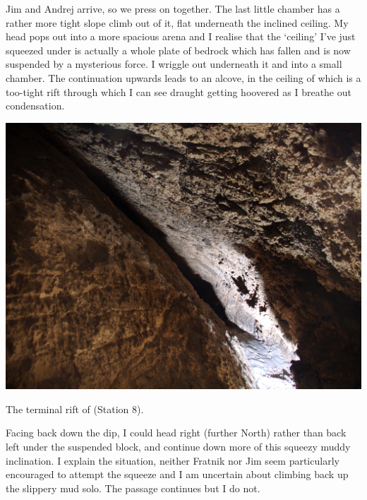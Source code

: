     
Jim and Andrej arrive, so we press on together. The last little chamber
has a rather more tight slope climb out of it, flat underneath the
inclined ceiling. My head pops out into a more spacious arena and I
realise that the `ceiling' I've just squeezed under is actually a whole
plate of bedrock which has fallen and is now suspended by a mysterious
force. I wriggle out underneath it and into a small chamber. The
continuation upwards leads to an alcove, in the ceiling of which is a
too-tight rift through which I can see draught getting hoovered as I
breathe out condensation.


\begin{pagefigure}
\checkoddpage \ifoddpage \forcerectofloat \else \forceversofloat \fi
   \centering
\includegraphics[width = \textwidth]{2011/winter_journey/2011-08-05-03.17.26-Jarvist Frost-CanonG5-CRW_0130 - Terminal Rift - Winters Journey Station Eight - Flash Hidden--orig.jpg}
\caption{The terminal rift of  (Station 8). } \label{terminal winter journey}
\end{pagefigure}

Facing back down the dip, I could head right (further North) rather than
back left under the suspended block, and continue down more of this
squeezy muddy inclination. I explain the situation, neither Fratnik nor
Jim seem particularly encouraged to attempt the squeeze and I am
uncertain about climbing back up the slippery mud solo. The passage
continues but I do not.

